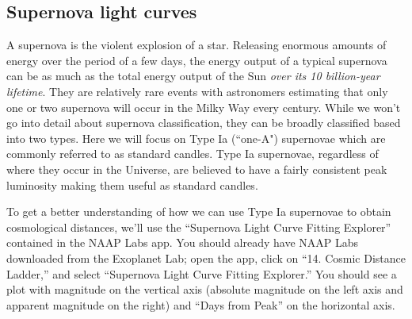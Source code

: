 \documentclass[11pt]{article}
\begin{document}
\subsection{Supernova light curves}

A supernova is the violent explosion of a star. Releasing enormous amounts of energy over the period of a few days, the energy output of a typical supernova can be as much as the total energy output of the Sun \textsl{over its 10 billion-year lifetime}. They are relatively rare events with astronomers estimating that only one or two supernova will occur in the Milky Way every century. While we won't go into detail about supernova classification, they can be broadly classified based into two types. Here we will focus on Type Ia (``one-A") supernovae which are commonly referred to as standard candles. Type Ia supernovae, regardless of where they occur in the Universe, are believed to have a fairly consistent peak luminosity making them useful as standard candles.

\medskip \noindent
To get a better understanding of how we can use Type Ia supernovae to obtain cosmological distances, we'll use the ``Supernova Light Curve Fitting Explorer'' contained in the NAAP Labs app. You should already have NAAP Labs downloaded from the Exoplanet Lab; open the app, click on ``14. Cosmic Distance Ladder,'' and select ``Supernova Light Curve Fitting Explorer.'' You should see a plot with magnitude on the vertical axis (absolute magnitude on the left axis and apparent magnitude on the right) and ``Days from Peak'' on the horizontal axis.
\end{document}
